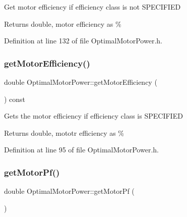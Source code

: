 Get motor efficiency if efficiency class is not S\+P\+E\+C\+I\+F\+I\+ED

\begin{DoxyReturn}{Returns}
double, motor efficiency as \% 
\end{DoxyReturn}


Definition at line 132 of file Optimal\+Motor\+Power.\+h.

\mbox{\label{class_optimal_motor_power_a10b3528bec621cab146608c6326526e3}} 
\subsubsection{\texorpdfstring{get\+Motor\+Efficiency()}{getMotorEfficiency()}}
{\footnotesize\ttfamily double Optimal\+Motor\+Power\+::get\+Motor\+Efficiency (\begin{DoxyParamCaption}{ }\end{DoxyParamCaption}) const\hspace{0.3cm}{\ttfamily [inline]}}

Gets the motor efficiency if efficiency class is S\+P\+E\+C\+I\+F\+I\+ED

\begin{DoxyReturn}{Returns}
double, mototr efficiency as \% 
\end{DoxyReturn}


Definition at line 95 of file Optimal\+Motor\+Power.\+h.

\mbox{\label{class_optimal_motor_power_a94d4c8a84c1bd19b799e35b966368f5a}} 
\subsubsection{\texorpdfstring{get\+Motor\+Pf()}{getMotorPf()}}
{\footnotesize\ttfamily double Optimal\+Motor\+Power\+::get\+Motor\+Pf (\begin{DoxyParamCaption}{ }\end{DoxyParamCaption})\hspace{0.3cm}{\ttfamily [inline]}}

